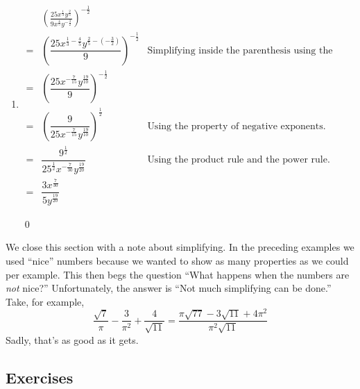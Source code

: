 \begin{ex}
\begin{enumerate}
\item \[
\begin{array}{cll}
&\left( \frac{25 x^{\frac{1}{3}} y^{\frac{2}{5}}}{9 x^{\frac{4}{5}} y^{-\frac{3}{2}}} \right)^{- \frac{1}{2}} & \\[8pt]
=&\left( \dfrac{25 x^{\frac{1}{3}-\frac{4}{5}} y^{\frac{2}{5}-\left(-\frac{3}{2}\right)}}{9} \right)^{-\frac{1}{2}} &  \text{Simplifying inside the parenthesis using the quotient rule}\\[8pt]
=&\left( \dfrac{25 x^{- \frac{7}{15}} y^{\frac{19}{10}}}{9} \right)^{-\frac{1}{2}} &  \\[8pt]
=&\left( \dfrac{9}{25 x^{- \frac{7}{15}} y^{\frac{19}{10}}}\right)^{\frac{1}{2}} & \text{Using the property of negative exponents.}\\[8pt]
=&\dfrac{9^{\frac{1}{2}}}{25^{\frac{1}{2}} x^{- \frac{7}{30}}y^{\frac{19}{20}}} & \text{Using the product rule and the power rule.}\\[8pt]
=&\dfrac{3 x^{\frac{7}{30}}}{5 y^{\frac{19}{20}}} 
\end{array}
\]

\vspace{-.3in} \qed
\end{enumerate}
\end{ex}

\co{\midskip}

We close this section with a note about simplifying.  In the preceding examples we used ``nice'' numbers because we wanted to show as many properties as we could per example. This then begs the question ``What happens when the numbers are \emph{not} nice?''  Unfortunately, the answer is ``Not much simplifying can be done.''  Take, for example,\[\frac{\sqrt{7}}{\pi} - \frac{3}{\pi^{2}} + \frac{4}{\sqrt{11}} = \frac{\pi\sqrt{77} - 3\sqrt{11} + 4\pi^{2}}{\pi^{2}\sqrt{11}}\]Sadly, that's as good as it gets.

\newpage

\subsection{Exercises}



\closegraphsfile
